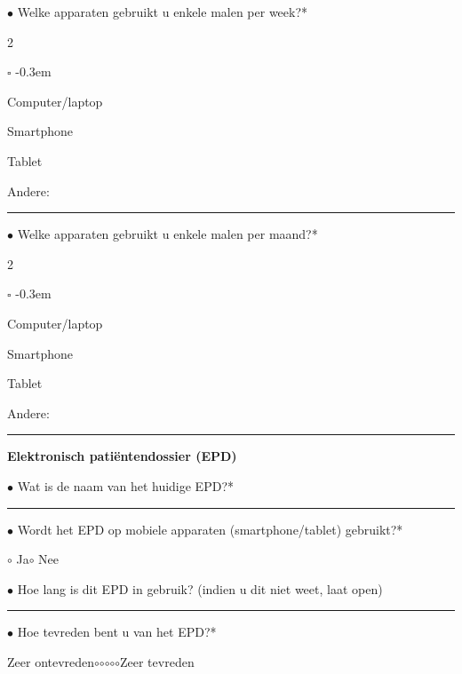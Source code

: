     \noindent \(\bullet\) Welke apparaten gebruikt u enkele malen per week?*
    \vspace{-8pt}
    \begin{multicols}{2}
        \begin{list}{\(\square\)}{} 
            \itemsep-0.3em 
            \item Computer/laptop
            \item Smartphone
            \item Tablet
            \item Andere: \rule{0.2\textwidth}{0.4pt}
        \end{list}
    \end{multicols}

    \noindent \(\bullet\) Welke apparaten gebruikt u enkele malen per maand?*
    \vspace{-8pt}
    \begin{multicols}{2}
        \begin{list}{\(\square\)}{} 
            \itemsep-0.3em 
            \item Computer/laptop
            \item Smartphone
            \item Tablet
            \item Andere: \rule{0.2\textwidth}{0.4pt}
        \end{list}
    \end{multicols}

    \noindent\textbf{Elektronisch pati\"{e}ntendossier (EPD)}\bigskip

    \noindent \(\bullet\) Wat is de naam van het huidige EPD?*\hspace{6pt}\rule{0.4\textwidth}{0.4pt}\medskip

    \noindent \(\bullet\) Wordt het EPD op mobiele apparaten (smartphone/tablet) gebruikt?*
    \vspace{-6pt}
    \begin{center}
        \(\circ\) Ja\hspace{10pt}\(\circ\) Nee
    \end{center}

    \noindent \(\bullet\) Hoe lang is dit EPD in gebruik? (indien u dit niet weet, laat open)\hspace{6pt}\rule{0.1\textwidth}{0.4pt}\medskip

    \noindent \(\bullet\) Hoe tevreden bent u van het EPD?*
    \vspace{-6pt}
    \begin{center}
    Zeer ontevreden\hspace{20pt}\(\circ\)\hspace{20pt}\(\circ\)\hspace{20pt}\(\circ\)\hspace{20pt}\(\circ\)\hspace{20pt}\(\circ\)\hspace{20pt}Zeer tevreden
    \end{center}


